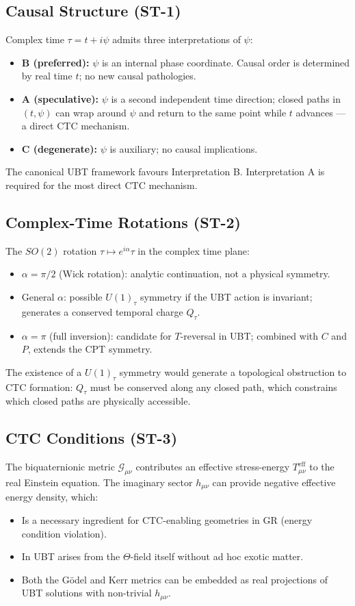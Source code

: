 \documentclass[12pt]{article}
\begin{document}
\subsection{Causal Structure (ST-1)}
Complex time $\tau = t + i\psi$ admits three interpretations of $\psi$:
\begin{itemize}
  \item \textbf{B (preferred):} $\psi$ is an internal phase coordinate.
    Causal order is determined by real time $t$; no new causal pathologies.
  \item \textbf{A (speculative):} $\psi$ is a second independent time
    direction; closed paths in $(t,\psi)$ can wrap around $\psi$ and
    return to the same point while $t$ advances — a direct CTC mechanism.
  \item \textbf{C (degenerate):} $\psi$ is auxiliary; no causal implications.
\end{itemize}
The canonical UBT framework favours Interpretation B.
Interpretation A is required for the most direct CTC mechanism.

\subsection{Complex-Time Rotations (ST-2)}
The $SO(2)$ rotation $\tau \mapsto e^{i\alpha}\tau$ in the complex time
plane:
\begin{itemize}
  \item $\alpha = \pi/2$ (Wick rotation): analytic continuation, not a
    physical symmetry.
  \item General $\alpha$: possible $U(1)_\tau$ symmetry if the UBT action
    is invariant; generates a conserved temporal charge $Q_\tau$.
  \item $\alpha = \pi$ (full inversion): candidate for $T$-reversal in UBT;
    combined with $C$ and $P$, extends the CPT symmetry.
\end{itemize}
The existence of a $U(1)_\tau$ symmetry would generate a topological
obstruction to CTC formation: $Q_\tau$ must be conserved along any closed
path, which constrains which closed paths are physically accessible.

\subsection{CTC Conditions (ST-3)}
The biquaternionic metric $\mathcal{G}_{\mu\nu}$ contributes an effective
stress-energy $T_{\mu\nu}^{\mathrm{eff}}$ to the real Einstein equation.
The imaginary sector $h_{\mu\nu}$ can provide negative effective energy
density, which:
\begin{itemize}
  \item Is a necessary ingredient for CTC-enabling geometries in GR
    (energy condition violation).
  \item In UBT arises from the $\Theta$-field itself without ad hoc exotic
    matter.
  \item Both the Gödel and Kerr metrics can be embedded as real projections
    of UBT solutions with non-trivial $h_{\mu\nu}$.
\end{itemize}
\end{document}
